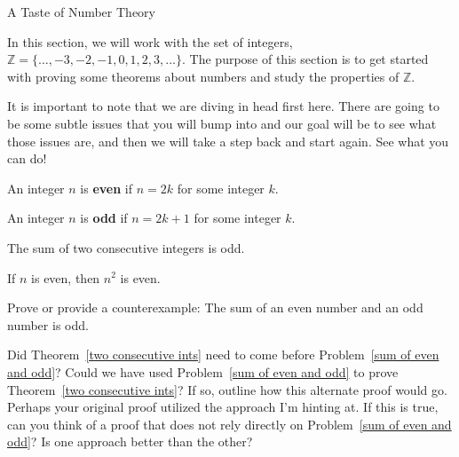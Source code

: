 \begin{section}{A Taste of Number Theory}


In this section, we will work with the set of integers, $\mathbb{Z} = \{\ldots, -3, -2, -1, 0, 1, 2, 3, \ldots\}$.  The purpose of this section is to get started with proving some theorems about numbers and study the properties of $\mathbb{Z}$.

It is important to note that we are diving in head first here.  There are going to be some subtle issues that you will bump into and our goal will be to see what those issues are, and then we will take a step back and start again.  See what you can do!

\begin{definition}
An integer $n$ is \textbf{even} if $n=2k$ for some integer $k$. \end{definition}

\begin{definition}
An integer $n$ is \textbf{odd} if $n=2k+1$ for some integer $k$. \end{definition}

\begin{theorem}\label{two consecutive ints}
The sum of two consecutive integers is odd.
\end{theorem}

\begin{theorem}
If $n$ is even, then $n^2$ is even.
\end{theorem}

\begin{problem}[*]\label{sum of even and odd}
Prove or provide a counterexample:  The sum of an even number and an odd number is odd.
\end{problem}

\begin{question}
Did Theorem~\ref{two consecutive ints} need to come before Problem~\ref{sum of even and odd}?  Could we have used Problem~\ref{sum of even and odd} to prove Theorem~\ref{two consecutive ints}?  If so, outline how this alternate proof would go.  Perhaps your original proof utilized the approach I'm hinting at.  If this is true, can you think of a proof that does not rely directly on Problem~\ref{sum of even and odd}?  Is one approach better than the other?
\end{question}


\end{section}

